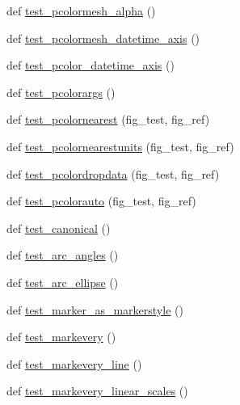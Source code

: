 \begin{DoxyCompactItemize}
def \hyperlink{namespacematplotlib_1_1tests_1_1test__axes_a27b1fada559c59dae8a923cf511e7717}{test\+\_\+pcolormesh\+\_\+alpha} ()
\item 
def \hyperlink{namespacematplotlib_1_1tests_1_1test__axes_a9dddf7059ca396c0699bab23fc4a4e1e}{test\+\_\+pcolormesh\+\_\+datetime\+\_\+axis} ()
\item 
def \hyperlink{namespacematplotlib_1_1tests_1_1test__axes_afe7d2e82be003a6312dbef9ac1ae0777}{test\+\_\+pcolor\+\_\+datetime\+\_\+axis} ()
\item 
def \hyperlink{namespacematplotlib_1_1tests_1_1test__axes_a4d58f947cdf06eae06c0b31af686bf00}{test\+\_\+pcolorargs} ()
\item 
def \hyperlink{namespacematplotlib_1_1tests_1_1test__axes_aaec96c12288c95785a6372bfb038451e}{test\+\_\+pcolornearest} (fig\+\_\+test, fig\+\_\+ref)
\item 
def \hyperlink{namespacematplotlib_1_1tests_1_1test__axes_abdecd56464f455d03e85957733bca345}{test\+\_\+pcolornearestunits} (fig\+\_\+test, fig\+\_\+ref)
\item 
def \hyperlink{namespacematplotlib_1_1tests_1_1test__axes_a68272f434bf8ff0928e836fa50a8ffbd}{test\+\_\+pcolordropdata} (fig\+\_\+test, fig\+\_\+ref)
\item 
def \hyperlink{namespacematplotlib_1_1tests_1_1test__axes_a10a9af2a8a1e8e7f56e174381138aaa3}{test\+\_\+pcolorauto} (fig\+\_\+test, fig\+\_\+ref)
\item 
def \hyperlink{namespacematplotlib_1_1tests_1_1test__axes_a6ed34406f2cfd216db830777af72d39f}{test\+\_\+canonical} ()
\item 
def \hyperlink{namespacematplotlib_1_1tests_1_1test__axes_a20454565aef3485cecbad0a337061274}{test\+\_\+arc\+\_\+angles} ()
\item 
def \hyperlink{namespacematplotlib_1_1tests_1_1test__axes_a2ac544aef53c42bc38c6f41a4a350d7c}{test\+\_\+arc\+\_\+ellipse} ()
\item 
def \hyperlink{namespacematplotlib_1_1tests_1_1test__axes_a06d2e383ea91299e4dc8a9e7cb42610e}{test\+\_\+marker\+\_\+as\+\_\+markerstyle} ()
\item 
def \hyperlink{namespacematplotlib_1_1tests_1_1test__axes_ac322c7f7545081810e294a096b45a269}{test\+\_\+markevery} ()
\item 
def \hyperlink{namespacematplotlib_1_1tests_1_1test__axes_aaacbb5053ae468067ba06c87797cb605}{test\+\_\+markevery\+\_\+line} ()
\item 
def \hyperlink{namespacematplotlib_1_1tests_1_1test__axes_ae2ed0f61c23f5024fef4cab16bd1b7e3}{test\+\_\+markevery\+\_\+linear\+\_\+scales} ()

\end{DoxyCompactItemize}
